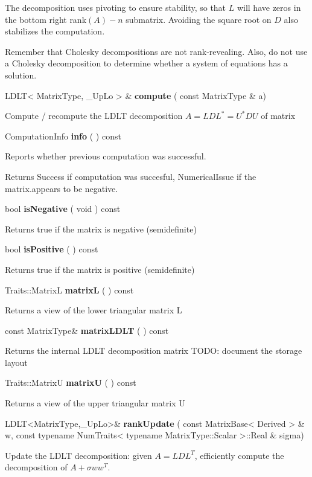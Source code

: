 The decomposition uses pivoting to ensure stability, so that $L$ will have zeros in the bottom right rank$(A) - n$ submatrix. Avoiding the square root on $D$ also stabilizes the computation.

Remember that Cholesky decompositions are not rank-revealing. Also, do not use a Cholesky decomposition to determine whether a system of equations has a solution.


\vspace{0.3cm}
LDLT< MatrixType, \_UpLo > \& \textbf{compute}  ( const MatrixType \&  a)   

Compute / recompute the LDLT decomposition $A = L D L^* = U^* D U$ of matrix 


\vspace{0.3cm}
ComputationInfo \textbf{info}  ( )  const 

Reports whether previous computation was successful. 

Returns Success if computation was succesful, NumericalIssue if the matrix.appears to be negative. 


\vspace{0.3cm}
bool \textbf{isNegative}  ( void  )  const 

Returns true if the matrix is negative (semidefinite) 


\vspace{0.3cm}
bool \textbf{isPositive}  ( )  const 

Returns true if the matrix is positive (semidefinite) 


\vspace{0.3cm}
Traits::MatrixL \textbf{matrixL}  ( )  const 

Returns a view of the lower triangular matrix L 


\vspace{0.3cm}
const MatrixType\& \textbf{matrixLDLT}  ( )  const 

Returns the internal LDLT decomposition matrix
TODO: document the storage layout 


\vspace{0.3cm}
Traits::MatrixU \textbf{matrixU}  ( )  const 

Returns a view of the upper triangular matrix U 


\vspace{0.3cm}
LDLT<MatrixType,\_UpLo>\& \textbf{rankUpdate}  ( const MatrixBase< Derived > \&  w,  const typename NumTraits< typename MatrixType::Scalar >::Real \&  sigma)   

Update the LDLT decomposition: given $A = L D L^T$, efficiently compute the decomposition of $A + \sigma w w^T$. 

